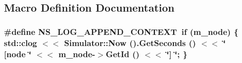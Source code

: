 \subsection{Macro Definition Documentation}
\subsubsection[{\texorpdfstring{N\+S\+\_\+\+L\+O\+G\+\_\+\+A\+P\+P\+E\+N\+D\+\_\+\+C\+O\+N\+T\+E\+XT}{NS_LOG_APPEND_CONTEXT}}]{\setlength{\rightskip}{0pt plus 5cm}\#define N\+S\+\_\+\+L\+O\+G\+\_\+\+A\+P\+P\+E\+N\+D\+\_\+\+C\+O\+N\+T\+E\+XT~{\bf if} (m\+\_\+node) \{ std\+::clog $<$$<$ Simulator\+::\+Now ().Get\+Seconds () $<$$<$ \char`\"{} \mbox{[}node \char`\"{} $<$$<$ m\+\_\+node-\/$>$Get\+Id () $<$$<$ \char`\"{}\mbox{]} \char`\"{}; \}}\hypertarget{nsc-tcp-l4-protocol_8cc_abe50035652d407c40bdaef78214c4955}{}\label{nsc-tcp-l4-protocol_8cc_abe50035652d407c40bdaef78214c4955}
